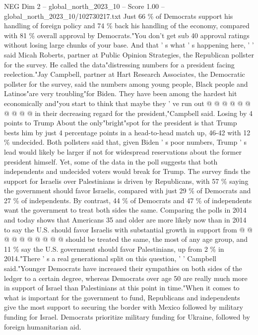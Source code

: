 \begin{textsample}{NEG Dim 2 – global\_north\_2023\_10 – Score 1.00 – global\_north\_2023\_10/102730217.txt}
Just 66 \% of Democrats support his handling of foreign policy and 74 \% back his handling of the economy, compared with 81 \% overall approval by Democrats."You don't get sub 40 approval ratings without losing large chunks of your base.
And that ' s what ' s happening here, ' ' said Micah Roberts, partner at Public Opinion Strategies, the Republican pollster for the survey.
He called the data"distressing numbers for a president facing reelection."Jay Campbell, partner at Hart Research Associates, the Democratic pollster for the survey, said the numbers among young people, Black people and Latinos"are very troubling"for Biden.
They have been among the hardest hit economically and"you start to think that maybe they ' ve run out @ @ @ @ @ @ @ @ @ @ in their decreasing regard for the president,"Campbell said.
Losing by 4 points to Trump About the only"bright"spot for the president is that Trump bests him by just 4 percentage points in a head-to-head match up, 46-42 with 12 \% undecided.
Both pollsters said that, given Biden ' s poor numbers, Trump ' s lead would likely be larger if not for widespread reservations about the former president himself.
Yet, some of the data in the poll suggests that both independents and undecided voters would break for Trump.
The survey finds the support for Israelis over Palestinians is driven by Republicans, with 57 \% saying the government should favor Israelis, compared with just 29 \% of Democrats and 27 \% of independents.
By contrast, 44 \% of Democrats and 47 \% of independents want the government to treat both sides the same.
Comparing the polls in 2014 and today shows that Americans 35 and older are more likely now than in 2014 to say the U.S. should favor Israelis with substantial growth in support from @ @ @ @ @ @ @ @ @ @ should be treated the same, the most of any age group, and 11 \% say the U.S. government should favor Palestinians, up from 2 \% in 2014."There ' s a real generational split on this question, ' ' Campbell said."Younger Democrats have increased their sympathies on both sides of the ledger to a certain degree, whereas Democrats over age 50 are really much more in support of Israel than Palestinians at this point in time."When it comes to what is important for the government to fund, Republicans and independents give the most support to securing the border with Mexico followed by military funding for Israel.
Democrats prioritize military funding for Ukraine, followed by foreign humanitarian aid.

\end{textsample}

